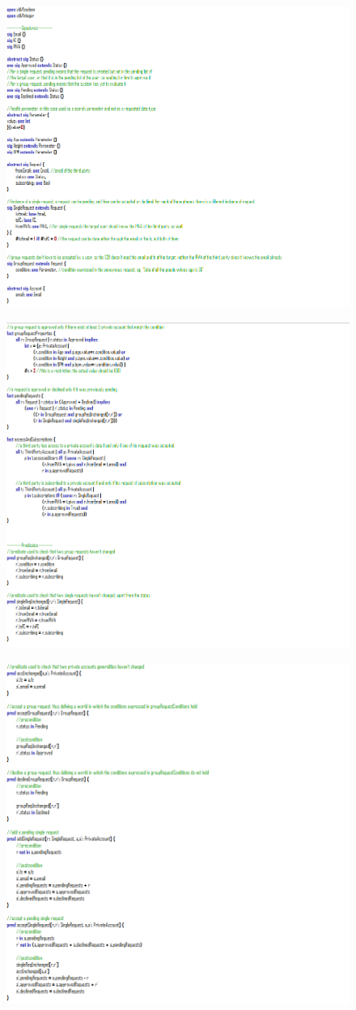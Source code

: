 \documentclass[titlepage]{article}
\begin{document}
		\begin{figure}[H]
			\center
  			\includegraphics[width=0.7\columnwidth]{Alloy/Dynamic2.png}
			\label{fig:dyn2}
		\end{figure}

		\begin{figure}[H]
			\center
  			\includegraphics[width=0.7\columnwidth]{Alloy/Dynamic3.png}
			\label{fig:dyn3}
		\end{figure}

		\begin{figure}[H]
			\center
  			\includegraphics[width=0.7\columnwidth]{Alloy/Dynamic4.png}
			\label{fig:dyn4}
		\end{figure}
\end{document}
